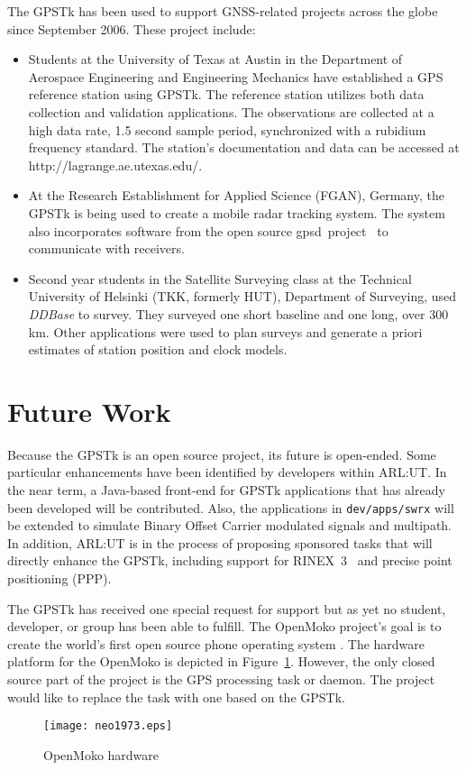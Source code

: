 \documentclass[letterpaper,ugly,10pt]{ion-gps}
\newcommand{\gpstkapp}[1]{\textit{\mbox{#1}}}
\newcommand{\gpstkdir}[1]{\texttt{\mbox{#1}}}
\begin{document}
The GPSTk has been used to support GNSS-related projects across the globe since September 2006. These project include:
\begin{itemize}
\item  Students at the University of Texas at Austin in the Department of Aerospace Engineering and Engineering Mechanics have established a GPS reference station using GPSTk. The reference station utilizes both data collection and validation applications. The observations are collected at a high data rate, 1.5 second sample period, synchronized with a rubidium frequency standard. The station's documentation and data can be accessed at http://lagrange.ae.utexas.edu/.
\item At the Research Establishment for Applied Science (FGAN), Germany, the GPSTk is being used to create a mobile radar tracking system. The system also incorporates software from the open source \mbox{gpsd project \cite{gpsd}} to communicate with receivers.
\item Second year students in the Satellite Surveying class at the Technical University of Helsinki (TKK, formerly HUT), Department of Surveying, used \gpstkapp{DDBase} to survey. They surveyed one short baseline and one long, over 300 km. Other applications were used to plan surveys and generate a priori estimates of station position and clock models.
\end{itemize}

\section*{Future Work}

Because the GPSTk is an open source project, its future is open-ended. Some particular enhancements have been identified by developers within ARL:UT. In the near term, a Java-based front-end for GPSTk applications that has already been developed will be contributed. Also, the applications in \gpstkdir{dev/apps/swrx} will be extended to simulate Binary Offset Carrier modulated signals and multipath. In addition, ARL:UT is in the process of proposing sponsored tasks that will directly enhance the GPSTk, including support for \mbox{RINEX 3  \cite{rinex300format}} and precise point positioning (PPP).

The GPSTk has received one special request for support but as yet no student, developer, or group has been able to fulfill. The OpenMoko project's goal is to create the world's first open source phone operating system \cite{openmoko,openmokowiki}. The hardware platform for the OpenMoko is depicted in Figure~\ref{fig:neo1973}. However, the only closed source part of the project is the GPS processing task or daemon. The project would like to replace the task with one based on the GPSTk. 
%
\begin{figure}
	\centering
	\texttt{[image: neo1973.eps]}
	\caption{OpenMoko hardware}
	\label{fig:neo1973}
\end{figure}
\end{document}
